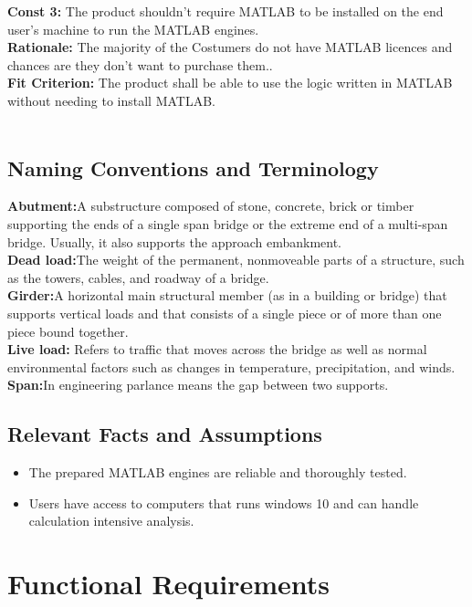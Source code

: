 \documentclass[12pt]{article}
\begin{document}
    \textbf{Const 3:} The product shouldn't require MATLAB to be installed on the end user’s machine to run the MATLAB engines. \\
    \textbf{Rationale:} The majority of the Costumers do not have MATLAB licences and chances are they don’t want to purchase them..\\
    \textbf{Fit Criterion:} The product shall be able to use the logic written in MATLAB without needing to install MATLAB.\\\\

\subsection{Naming Conventions and Terminology}
\textbf{Abutment:}A substructure composed of stone, concrete, brick or timber supporting the ends of a single span bridge or the extreme end of a multi-span bridge. Usually, it also supports the approach embankment.\\
\textbf{Dead load:}The weight of the permanent, nonmoveable parts of a structure, such as the towers, cables, and roadway of a bridge.\\
\textbf{Girder:}A horizontal main structural member (as in a building or bridge) that supports vertical loads and that consists of a single piece or of more than one piece bound together.\\
\textbf{Live load:} Refers to traffic that moves across the bridge as well as normal environmental factors such as changes in temperature, precipitation, and winds.\\
\textbf{Span:}In engineering parlance means the gap between two supports.

\subsection{Relevant Facts and Assumptions}
\begin{itemize}
  \item The prepared MATLAB engines are reliable and thoroughly tested.
  \item Users have access to computers that runs windows 10 and can handle calculation intensive analysis.
\end{itemize}


\section{Functional Requirements}
\end{document}
